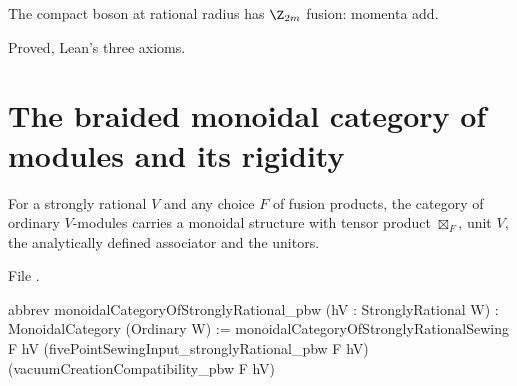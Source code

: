 \begin{physics}
The compact boson at rational radius has $\Z_{2m}$ fusion: momenta add.
\end{physics}

\begin{status}
Proved, Lean's three axioms.
\end{status}

\section{The braided monoidal category of modules and its rigidity}\label{l21:sec:mtc}

\begin{theorem}\label{l21:thm:monoidal}
For a strongly rational $V$ and any choice $F$ of fusion products, the category of ordinary $V$-modules carries a monoidal
structure with tensor product $\boxtimes_F$, unit $V$, the analytically defined associator and the unitors.
\end{theorem}
\noindent File .
\begin{leancode}
abbrev monoidalCategoryOfStronglyRational_pbw (hV : StronglyRational W) :
    MonoidalCategory (Ordinary W) :=
  monoidalCategoryOfStronglyRationalSewing F hV (fivePointSewingInput_stronglyRational_pbw F hV)
    (vacuumCreationCompatibility_pbw F hV)

\end{leancode}

